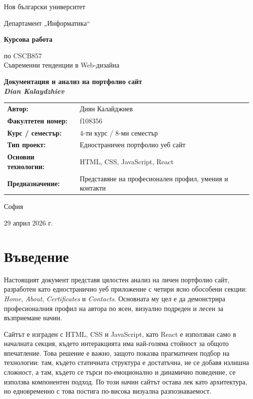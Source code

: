 \documentclass[11pt,a4paper]{article}
\begin{document}
\begin{titlepage}
    \centering
    \vspace*{2cm}
    {\Large Нов български университет\par}
    \vspace{0.8cm}
    {\large Департамент „Информатика“\par}
    \vfill
    {\Huge\bfseries Курсова работа\par}
    \vspace{0.5cm}
    {\Large по CSCB857\\[0.2cm]Съвременни тенденции в Web-дизайна\par}
    \vspace{1.2cm}
    {\LARGE\bfseries Документация и анализ на портфолио сайт\\[0.2cm]\textit{Dian Kalaydzhiev}\par}
    \vspace{1.2cm}
    \begin{tabular}{>{\bfseries}p{4.3cm}p{8cm}}
        Автор: & Диян Калайджиев \\
        Факултетен номер: & f108356 \\
        Курс / семестър: & 4-ти курс / 8-ми семестър \\
        Тип проект: & Едностраничен портфолио уеб сайт \\
        Основни технологии: & HTML, CSS, JavaScript, React \\
        Предназначение: & Представяне на професионален профил, умения и контакти \\
    \end{tabular}
    \vfill
    {\large София\par}
    {\large 29 април 2026 г.\par}
\end{titlepage}

\tableofcontents
\clearpage

\section{Въведение}
Настоящият документ представя цялостен анализ на личен портфолио сайт, разработен като едностранично уеб приложение с четири ясно обособени секции: \textit{Home}, \textit{About}, \textit{Certificates} и \textit{Contacts}. Основната му цел е да демонстрира професионалния профил на автора по ясен, визуално подреден и лесен за възприемане начин.

Сайтът е изграден с HTML, CSS и JavaScript, като React е използван само в началната секция, където интеракцията има най-голяма стойност за общото впечатление. Това решение е важно, защото показва прагматичен подбор на технологии: там, където статичната структура е достатъчна, не се добавя излишна сложност, а там, където се търси по-емоционално и динамично поведение, се използва компонентен подход. По този начин сайтът остава лек като архитектура, но едновременно с това постига по-висока визуална разпознаваемост.
\end{document}
